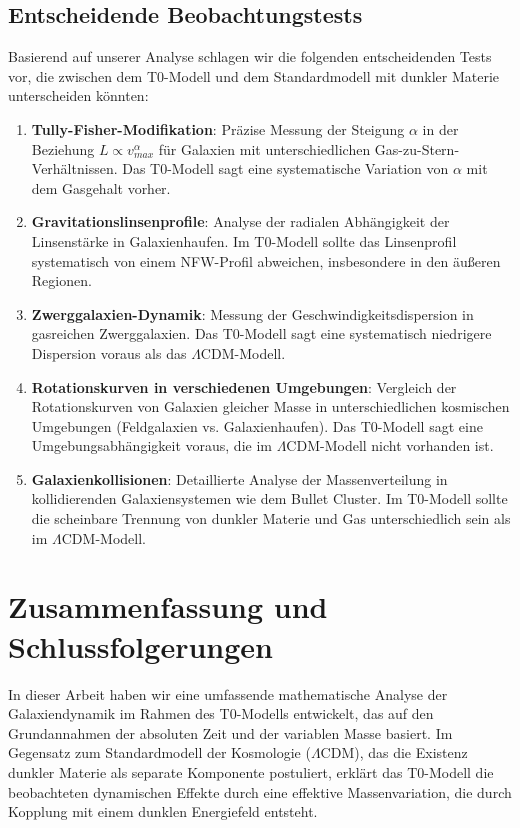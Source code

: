 \documentclass[a4paper,12pt]{article}
\begin{document}
	\subsection{Entscheidende Beobachtungstests}
	
	Basierend auf unserer Analyse schlagen wir die folgenden entscheidenden Tests vor, die zwischen dem T0-Modell und dem Standardmodell mit dunkler Materie unterscheiden könnten:
	
	\begin{enumerate}
		\item \textbf{Tully-Fisher-Modifikation}: Präzise Messung der Steigung $\alpha$ in der Beziehung $L \propto v_{max}^{\alpha}$ für Galaxien mit unterschiedlichen Gas-zu-Stern-Verhältnissen. Das T0-Modell sagt eine systematische Variation von $\alpha$ mit dem Gasgehalt vorher.
		
		\item \textbf{Gravitationslinsenprofile}: Analyse der radialen Abhängigkeit der Linsenstärke in Galaxienhaufen. Im T0-Modell sollte das Linsenprofil systematisch von einem NFW-Profil abweichen, insbesondere in den äußeren Regionen.
		
		\item \textbf{Zwerggalaxien-Dynamik}: Messung der Geschwindigkeitsdispersion in gasreichen Zwerggalaxien. Das T0-Modell sagt eine systematisch niedrigere Dispersion voraus als das $\Lambda$CDM-Modell.
		
		\item \textbf{Rotationskurven in verschiedenen Umgebungen}: Vergleich der Rotationskurven von Galaxien gleicher Masse in unterschiedlichen kosmischen Umgebungen (Feldgalaxien vs. Galaxienhaufen). Das T0-Modell sagt eine Umgebungsabhängigkeit voraus, die im $\Lambda$CDM-Modell nicht vorhanden ist.
		
		\item \textbf{Galaxienkollisionen}: Detaillierte Analyse der Massenverteilung in kollidierenden Galaxiensystemen wie dem Bullet Cluster. Im T0-Modell sollte die scheinbare Trennung von dunkler Materie und Gas unterschiedlich sein als im $\Lambda$CDM-Modell.
	\end{enumerate}
	
	\section{Zusammenfassung und Schlussfolgerungen}
	
	In dieser Arbeit haben wir eine umfassende mathematische Analyse der Galaxiendynamik im Rahmen des T0-Modells entwickelt, das auf den Grundannahmen der absoluten Zeit und der variablen Masse basiert. Im Gegensatz zum Standardmodell der Kosmologie ($\Lambda$CDM), das die Existenz dunkler Materie als separate Komponente postuliert, erklärt das T0-Modell die beobachteten dynamischen Effekte durch eine effektive Massenvariation, die durch Kopplung mit einem dunklen Energiefeld entsteht.
	
\end{document}
